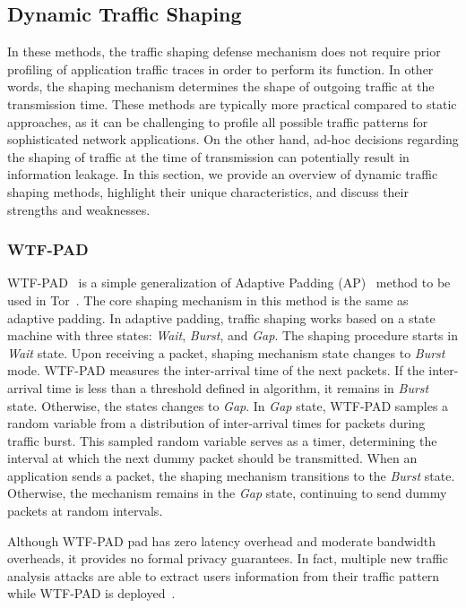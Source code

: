 \subsection{Dynamic Traffic Shaping}\label{subsec:dynamic-traffic-shaping}
In these methods, the traffic shaping defense mechanism does not require prior profiling of application traffic traces in order to perform its function.  
In other words, the shaping mechanism determines the shape of outgoing traffic at the transmission time.
These methods are typically more practical compared to static approaches, as it can be challenging to profile all possible traffic patterns for sophisticated network applications.
On the other hand, ad-hoc decisions regarding the shaping of traffic at the time of transmission can potentially result in information leakage.
In this section, we provide an overview of dynamic traffic shaping methods, highlight their unique characteristics, and discuss their strengths and weaknesses.

\subsubsection{WTF-PAD}\label{subsubsec:wtf-pad}
WTF-PAD~\cite{juarez2016toward} is a simple generalization of Adaptive Padding (AP)~\cite{shmatikov2006timing} method to be used in Tor~\cite{dingledine2004tor}. 
The core shaping mechanism in this method is the same as adaptive padding. 
In adaptive padding, traffic shaping works based on a state machine with three states: \textit{Wait}, \textit{Burst}, and \textit{Gap}. 
The shaping procedure starts in \textit{Wait} state. 
Upon receiving a packet, shaping mechanism state changes to \textit{Burst} mode. 
WTF-PAD measures the inter-arrival time of the next packets. 
If the inter-arrival time is less than a threshold defined in algorithm, it remains in \textit{Burst} state. Otherwise, the states changes to \textit{Gap}.
In \textit{Gap} state, WTF-PAD samples a random variable from a distribution of inter-arrival times for packets during traffic burst.
This sampled random variable serves as a timer, determining the interval at which the next dummy packet should be transmitted.
When an application sends a packet, the shaping mechanism transitions to the \textit{Burst} state. Otherwise, the mechanism remains in the \textit{Gap} state, continuing to send dummy packets at random intervals. 

Although WTF-PAD pad has zero latency overhead and moderate bandwidth overheads, it provides no formal privacy guarantees.
In fact, multiple new traffic analysis attacks are able to extract users information from their traffic pattern while WTF-PAD is deployed~\cite{sirinam2018df}.



